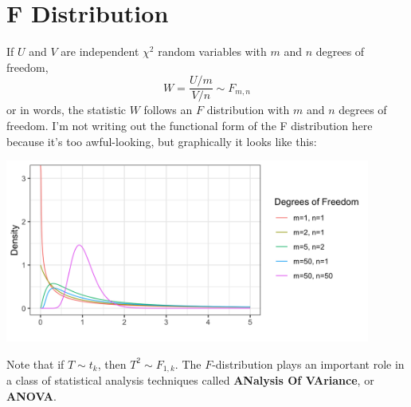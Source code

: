 \section{F Distribution \label{sect:fdist}}

If $U$ and $V$ are independent $\chi^2$ random variables with $m$ and $n$ degrees of freedom,
$$ W = \frac{U/m}{V/n} \sim F_{m, n} $$
or in words, the statistic $W$ follows an $F$ distribution with $m$ and $n$ degrees of freedom. I'm not writing out the functional form of the F distribution here because it's too awful-looking, but graphically it looks like this:
\begin{center}
\includegraphics[width=0.9\textwidth]{img/hyp-example-f-distribution.png}
\end{center}

Note that if $T \sim t_k$, then $T^2 \sim F_{1,k}$. The $F$-distribution plays an important role in a class of statistical analysis techniques called \textbf{ANalysis Of VAriance}, or \textbf{ANOVA}.

\vspace{2mm}

